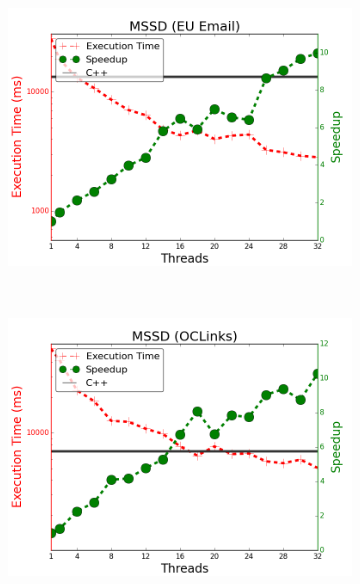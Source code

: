 \begin{figure}[]
        \centering
        \begin{subfigure}[b]{\plotsize\textwidth}
                \includegraphics[width=\textwidth]{experiments/scalability/scale-shortest-email.png}
                \label{fig:implementation:scale_sssp_email}
        \end{subfigure}
        ~
        \begin{subfigure}[b]{\plotsize\textwidth}
                \includegraphics[width=\textwidth]{experiments/scalability/scale-shortest-oclinks.png}
                \label{fig:implementation:scale_sssp_oclinks}

\end{subfigure}
\end{figure}
